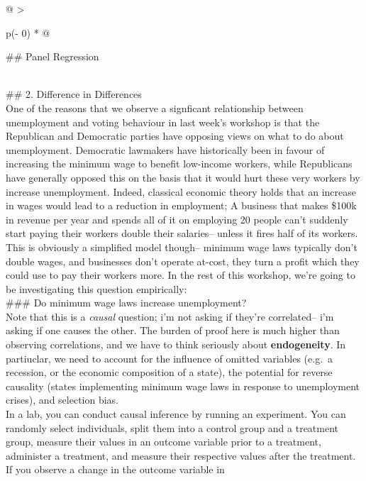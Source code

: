 \documentclass[
  letterpaper,
  DIV=11,
  numbers=noendperiod]{scrreprt}
\begin{document}
\begin{longtable}[]{@{}
  >{\raggedright\arraybackslash}p{(\columnwidth - 0\tabcolsep) * }@{}}
\toprule\noalign{}
\begin{minipage}[b]{\linewidth}\raggedright
\#\# Panel Regression
\end{minipage} \\
\midrule\noalign{}
\endhead
\bottomrule\noalign{}
\endlastfoot
\#\# 2. Difference in Differences \\
One of the reasons that we observe a signficant relationship between
unemployment and voting behaviour in last week's workshop is that the
Republican and Democratic parties have opposing views on what to do
about unemployment. Democratic lawmakers have historically been in
favour of increasing the minimum wage to benefit low-income workers,
while Republicans have generally opposed this on the basis that it would
hurt these very workers by increase unemployment. Indeed, classical
economic theory holds that an increase in wages would lead to a
reduction in employment; A business that makes \$100k in revenue per
year and spends all of it on employing 20 people can't suddenly start
paying their workers double their salaries-- unless it fires half of its
workers. This is obviously a simplified model though-- minimum wage laws
typically don't double wages, and businesses don't operate at-cost, they
turn a profit which they could use to pay their workers more. In the
rest of this workshop, we're going to be investigating this question
empirically: \\
\#\#\# Do minimum wage laws increase unemployment? \\
Note that this is a \emph{causal} question; i'm not asking if they're
correlated-- i'm asking if one causes the other. The burden of proof
here is much higher than observing correlations, and we have to think
seriously about \textbf{endogeneity}. In partiuclar, we need to account
for the influence of omitted variables (e.g.~a recession, or the
economic composition of a state), the potential for reverse causality
(states implementing minimum wage laws in response to unemployment
crises), and selection bias. \\
In a lab, you can conduct causal inference by running an experiment. You
can randomly select individuals, split them into a control group and a
treatment group, measure their values in an outcome variable prior to a
treatment, administer a treatment, and measure their respective values
after the treatment. If you observe a change in the outcome variable in

\end{longtable}
\end{document}
